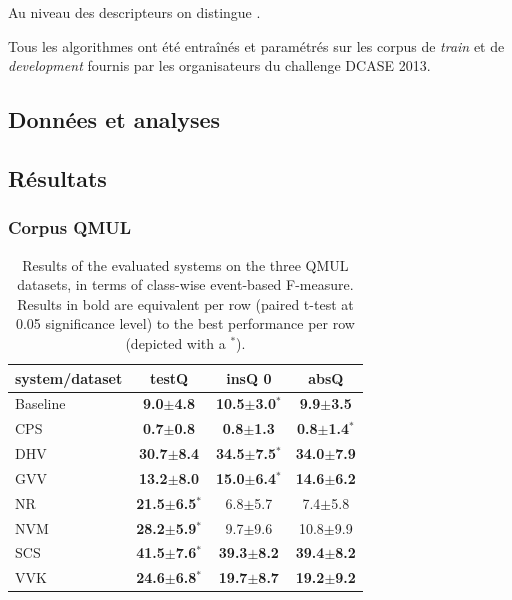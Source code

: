 Au niveau des descripteurs on distingue .

Tous les algorithmes ont été entraînés et paramétrés sur les corpus de \emph{train} et de \emph{development} fournis par les organisateurs du challenge DCASE 2013. \\

\subsection{Données et analyses}


\subsection{Résultats}

\subsubsection{Corpus QMUL}

\begin{table} 
\begin{center}  
\begin{tabular}{lccc}  
system/dataset & testQ & insQ 0 & absQ \\ 
\hline 
Baseline & \textbf{ 9.0$\pm$4.8}     & \textbf{10.5$\pm$3.0$^*$}   & \textbf{ 9.9$\pm$3.5} \\ 
CPS      & \textbf{0.7$\pm$0.8}      & \textbf{0.8$\pm$1.3}        & \textbf{0.8$\pm$1.4$^*$} \\ 
DHV      & \textbf{30.7$\pm$8.4}     & \textbf{34.5$\pm$7.5$^*$}   & \textbf{34.0$\pm$7.9} \\ 
GVV      & \textbf{13.2$\pm$8.0}     & \textbf{15.0$\pm$6.4$^*$}   & \textbf{14.6$\pm$6.2} \\ 
NR       & \textbf{21.5$\pm$6.5$^*$} &  6.8$\pm$5.7                &  7.4$\pm$5.8 \\ 
NVM      & \textbf{28.2$\pm$5.9$^*$} &  9.7$\pm$9.6                & 10.8$\pm$9.9 \\ 
SCS      & \textbf{41.5$\pm$7.6$^*$} & \textbf{39.3$\pm$8.2}       & \textbf{39.4$\pm$8.2} \\ 
VVK      & \textbf{24.6$\pm$6.8$^*$} & \textbf{19.7$\pm$8.7}       & \textbf{19.2$\pm$9.2} \\  
\hline
\end{tabular} 
\end{center} 
\caption{Results of the evaluated systems on the three QMUL datasets, in terms of class-wise event-based F-measure. Results in bold are equivalent per row (paired t-test at 0.05 significance level) to the best performance per row (depicted with a $^*$).} 
\label{tab:qmul} 
\end{table} 

